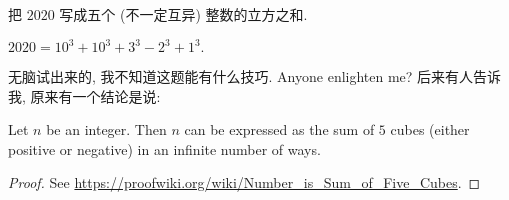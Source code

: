 \begin{prob}
\label{prob:prob-13}
把 $2020$ 写成五个 (不一定互异) 整数的立方之和.
\end{prob}

\begin{soln}
$\boxed{2020 = 10^3 + 10^3 + 3^3 - 2^3 + 1^3.}$
\end{soln}

\begin{rem*}
无脑试出来的, 我不知道这题能有什么技巧. Anyone enlighten me?
后来有人告诉我, 原来有一个结论是说:

\begin{thm}
Let $n$ be an integer. Then $n$ can be expressed as the sum of $5$ cubes
(either positive or negative) in an infinite number of ways.
\end{thm}

\begin{proof}
See \url{https://proofwiki.org/wiki/Number_is_Sum_of_Five_Cubes}.
\end{proof}
\end{rem*}
